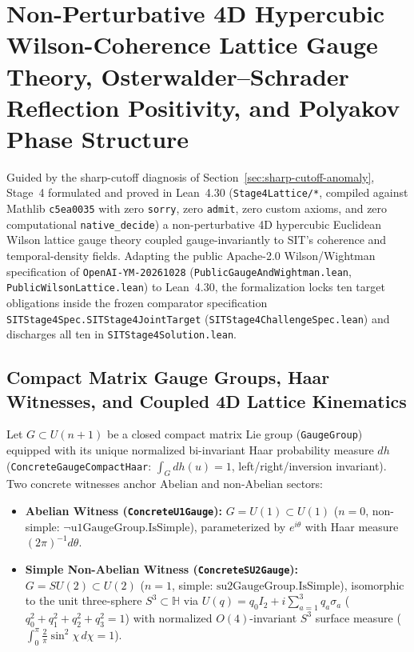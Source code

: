 \section{Non-Perturbative 4D Hypercubic Wilson-Coherence Lattice Gauge Theory, Osterwalder--Schrader Reflection Positivity, and Polyakov Phase Structure}
\label{sec:stage4-lattice}

Guided by the sharp-cutoff diagnosis of Section~\ref{sec:sharp-cutoff-anomaly}, Stage~4 formulated and proved in Lean~4.30 (\texttt{Stage4Lattice/*}, compiled against Mathlib \texttt{c5ea0035} with zero \texttt{sorry}, zero \texttt{admit}, zero custom axioms, and zero computational \texttt{native\_decide}) a non-perturbative 4D hypercubic Euclidean Wilson lattice gauge theory coupled gauge-invariantly to SIT's coherence and temporal-density fields. Adapting the public Apache-2.0 Wilson/Wightman specification of \texttt{OpenAI-YM-20261028} (\texttt{Public\allowbreak{}Gauge\allowbreak{}And\allowbreak{}Wightman.\allowbreak{}lean}, \texttt{Public\allowbreak{}Wilson\allowbreak{}Lattice.\allowbreak{}lean}) to Lean~4.30, the formalization locks ten target obligations inside the frozen comparator specification \texttt{SITStage4\allowbreak{}Spec.\allowbreak{}SITStage4\allowbreak{}Joint\allowbreak{}Target} (\texttt{SITStage4\allowbreak{}Challenge\allowbreak{}Spec.\allowbreak{}lean}) and discharges all ten in \texttt{SITStage4\allowbreak{}Solution.\allowbreak{}lean}.

\subsection{Compact Matrix Gauge Groups, Haar Witnesses, and Coupled 4D Lattice Kinematics}

Let $G \subset U(n+1)$ be a closed compact matrix Lie group (\texttt{GaugeGroup}) equipped with its unique normalized bi-invariant Haar probability measure $dh$ (\texttt{Concrete\allowbreak{}Gauge\allowbreak{}Compact\allowbreak{}Haar}: $\int_G dh(u) = 1$, left/right/inversion invariant). Two concrete witnesses anchor Abelian and non-Abelian sectors:
\begin{itemize}
  \item \textbf{Abelian Witness (\texttt{ConcreteU1Gauge}):} $G = U(1) \subset U(1)$ ($n=0$, non-simple: $\neg\mathrm{u1GaugeGroup.IsSimple}$), parameterized by $e^{i\theta}$ with Haar measure $(2\pi)^{-1}d\theta$.
  \item \textbf{Simple Non-Abelian Witness (\texttt{ConcreteSU2Gauge}):} $G = SU(2) \subset U(2)$ ($n=1$, simple: $\mathrm{su2GaugeGroup.IsSimple}$), isomorphic to the unit three-sphere $S^3 \subset \mathbb{H}$ via $U(q) = q_0 I_2 + i\sum_{a=1}^3 q_a\sigma_a$ ($q_0^2 + q_1^2 + q_2^2 + q_3^2 = 1$) with normalized $O(4)$-invariant $S^3$ surface measure ($\int_0^\pi \frac{2}{\pi}\sin^2\chi\,d\chi = 1$).
\end{itemize}


